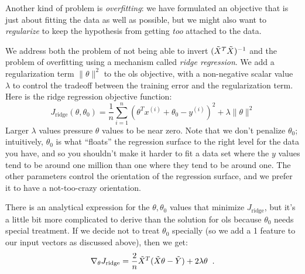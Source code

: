 Another kind of problem is {\em overfitting}: we have formulated an
objective that is just about fitting the data as well as possible, but
we might also
want to {\em regularize} to keep the hypothesis from getting {\em too}
attached to the data.

We address both the problem of not being able to invert $(\tilde{X}^T\tilde{X})^{-1}$ and
the problem of overfitting using a mechanism called {\em ridge
    regression}.  We add a regularization term $\|\theta\|^2$ to the
  {\sc ols} objective, with a non-negative scalar value $\lambda$ to control the tradeoff
between the training error and the regularization term.
Here is the ridge regression objective function:
$$ J_{\text{ridge}}(\theta, \theta_0) = \frac{1}{n}\sum_{i = 1}^n\left(\theta^Tx^{(i)} + \theta_0 - y^{(i)}\right)^2 + \lambda\|\theta\|^2 $$
Larger $\lambda$ values pressure $\theta$ values to be near zero.
Note that we don't penalize $\theta_0$; intuitively, $\theta_0$ is
what ``floats'' the regression surface to the right level for the data
you have, and so you shouldn't make it harder to fit a data set where
the $y$ values tend to be around one million than one where they tend
to be around one.  The other parameters control the orientation of the
regression surface, and we prefer it to have a not-too-crazy
orientation.

There is an analytical expression for the $\theta, \theta_0$ values
that minimize $J_\text{ridge}$, but it's a little bit more complicated
to derive than the solution for {\sc ols} because $\theta_0$ needs
special treatment.   If we decide not to treat $\theta_0$ specially
(so we add a 1 feature to our input vectors as discussed above), then we get:
$$ \nabla_{\theta}J_\text{ridge} = \frac{2}{n}\tilde{X}^T(\tilde{X}\theta - \tilde{Y}) + 2
  \lambda \theta\;\;.$$

